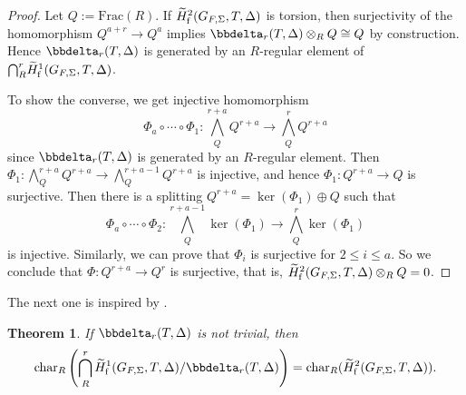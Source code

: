 \documentclass[10pt]{amsart}
\numberwithin{equation}{section}
\newtheorem{thm}{Theorem}[section]
\theoremstyle{definition}
\theoremstyle{remark} %
\begin{document}
		\begin{proof}
			Let $Q := \mathrm{Frac}(R)$. If $\widetilde{H}^2_{\rm f}(G_{F, \Sigma}, T, \Delta)$  is torsion, then surjectivity of the homomorphism $Q^{a+r} \to Q^a$ implies $
			\bbdelta_r(T, \Delta) \otimes_R Q   \cong Q 
			$
			by construction. Hence $\bbdelta_r(T, \Delta)$ is generated by an $R$-regular element of ${\bigcap}^{r}_{R}\widetilde{H}^1_{\rm f} (G_{F, \Sigma}, T, \Delta)$. 
			
			To show the converse, we get injective homomorphism 
			\[
			\varPhi_a \circ \cdots \circ \varPhi_1  \colon {\bigwedge}^{r+a}_Q Q^{r+a} \longrightarrow {\bigwedge}^r_{Q} Q^{r+a}
			\]
			since $\bbdelta_r(T, \Delta)$ is generated by an $R$-regular element. Then $\varPhi_1 \colon {\bigwedge}^{r+a}_Q Q^{r+a} \to {\bigwedge}^{r+a-1}_Q Q^{r+a}$ is injective, and hence $\varPhi_1 \colon Q^{r+a} \to Q$ is surjective. 
			Then there is a splitting $Q^{r+a} =  \ker(\varPhi_1)\oplus Q$ such that 
			\[
			\varPhi_a \circ \cdots \circ \varPhi_2  \colon \bigwedge^{r+a-1}_Q \ker(\varPhi_1) \rightarrow {\bigwedge}^r_{Q} \ker(\varPhi_1)
			\]
			is injective. Similarly, we can prove that $ \varPhi_i $ is surjective for $ 2 \le i \le a $. So we conclude that $\varPhi \colon Q^{r+a} \to Q^r$ is surjective, that is, 
			$\widetilde{H}^2_{\rm f}(G_{F, \Sigma}, T, \Delta) \otimes_R Q = 0$.  
		\end{proof}
		The next one is inspired by \cite[Theorem 5.6]{BCS23}.
		\begin{thm}
			\label{H2tors}
			If $\bbdelta_r(T,\Delta)$ is not trivial, then $$ \mathrm{char}_R\left(\bigcap^r_R \widetilde{H}^1_{\mathrm{f}}(G_{F,\Sigma},T,\Delta)/\bbdelta_r(T,\Delta)\right)  = \mathrm{char}_R(\widetilde{H}^2_{\mathrm{f}}(G_{F,\Sigma},T,\Delta)). $$
		\end{thm}
\end{document}
